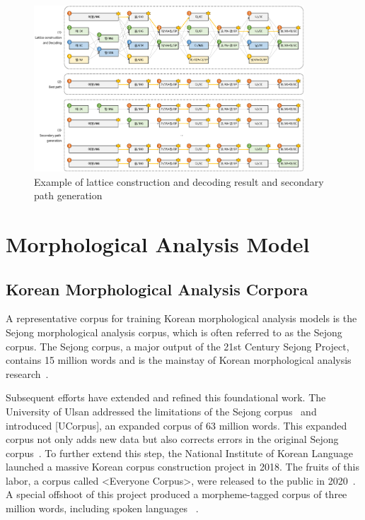 \documentclass[AMS,STIX2COL]{WileyNJD-v2}
\begin{document}
    \begin{figure}[t]
        \centerline{\includegraphics[width=0.9\textwidth]{fig2.1}}
        \caption{Example of lattice construction and decoding result and secondary path generation}\label{fig:lattice}
    \end{figure}


    \section{Morphological Analysis Model}\label{sec:morphological-analysis-model}

    \subsection{Korean Morphological Analysis Corpora}\label{subsec3.1}

    A representative corpus for training Korean morphological analysis models is the Sejong morphological analysis corpus, which is often referred to as the Sejong corpus. The Sejong corpus, a major output of the 21st Century Sejong Project, contains 15 million words and is the mainstay of Korean morphological analysis research~\cite{ChoeMW2008}.

    Subsequent efforts have extended and refined this foundational work. The University of Ulsan addressed the limitations of the Sejong corpus~\cite{KimIH2010} and introduced [UCorpus], an expanded corpus of 63 million words. This expanded corpus not only adds new data but also corrects errors in the original Sejong corpus~\cite{UCorpusHG}. To further extend this step, the National Institute of Korean Language launched a massive Korean corpus construction project in 2018. The fruits of this labor, a corpus called <Everyone Corpus>, were released to the public in 2020~\cite{EveryoneCorpus}. A special offshoot of this project produced a morpheme-tagged corpus of three million words, including spoken languages ~\cite{KimIH2019}.
\end{document}
